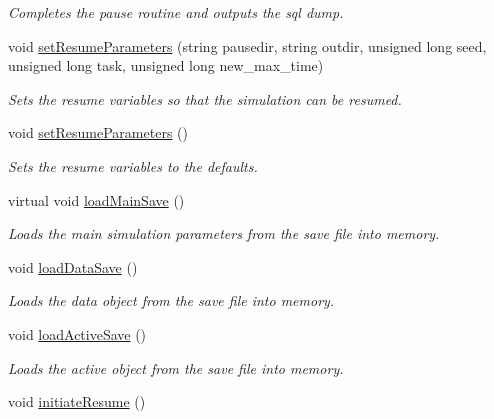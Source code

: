 \begin{DoxyCompactItemize}
\begin{DoxyCompactList}\small\item\em Completes the pause routine and outputs the sql dump. \end{DoxyCompactList}\item 
void \hyperlink{class_tree_ac545d844141db977920fc9fd76ce9dbb}{set\+Resume\+Parameters} (string pausedir, string outdir, unsigned long seed, unsigned long task, unsigned long new\+\_\+max\+\_\+time)
\begin{DoxyCompactList}\small\item\em Sets the resume variables so that the simulation can be resumed. \end{DoxyCompactList}\item 
void \hyperlink{class_tree_aeade4bccb8394937a53bc4fbcf2b4300}{set\+Resume\+Parameters} ()\hypertarget{class_tree_aeade4bccb8394937a53bc4fbcf2b4300}{}\label{class_tree_aeade4bccb8394937a53bc4fbcf2b4300}

\begin{DoxyCompactList}\small\item\em Sets the resume variables to the defaults. \end{DoxyCompactList}\item 
virtual void \hyperlink{class_tree_af57075728924141c7b6d311822a22dc0}{load\+Main\+Save} ()\hypertarget{class_tree_af57075728924141c7b6d311822a22dc0}{}\label{class_tree_af57075728924141c7b6d311822a22dc0}

\begin{DoxyCompactList}\small\item\em Loads the main simulation parameters from the save file into memory. \end{DoxyCompactList}\item 
void \hyperlink{class_tree_af7db53d4870d845741d3159f57b73b30}{load\+Data\+Save} ()\hypertarget{class_tree_af7db53d4870d845741d3159f57b73b30}{}\label{class_tree_af7db53d4870d845741d3159f57b73b30}

\begin{DoxyCompactList}\small\item\em Loads the data object from the save file into memory. \end{DoxyCompactList}\item 
void \hyperlink{class_tree_af145148202f11654d6d6a15a6c021924}{load\+Active\+Save} ()\hypertarget{class_tree_af145148202f11654d6d6a15a6c021924}{}\label{class_tree_af145148202f11654d6d6a15a6c021924}

\begin{DoxyCompactList}\small\item\em Loads the active object from the save file into memory. \end{DoxyCompactList}\item 
void \hyperlink{class_tree_a8cfe5d30d53d702f18cd67981e2c9acb}{initiate\+Resume} ()\hypertarget{class_tree_a8cfe5d30d53d702f18cd67981e2c9acb}{}\label{class_tree_a8cfe5d30d53d702f18cd67981e2c9acb}


\end{DoxyCompactItemize}
